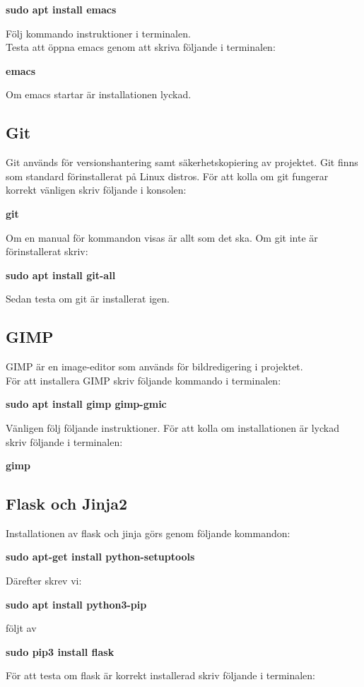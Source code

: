 \documentclass{TDP003mall}
\begin{document}
\textbf{sudo apt install emacs}

Följ kommando instruktioner i terminalen. \\
Testa att öppna emacs genom att skriva följande i terminalen:

\textbf{emacs}

Om emacs startar är installationen lyckad.

\subsection{Git}
Git används för versionshantering samt säkerhetskopiering av projektet. Git finns som standard förinstallerat på Linux distros. För att kolla om git fungerar korrekt vänligen skriv följande i konsolen:

\textbf{git}

Om en manual för kommandon visas är allt som det ska. Om git inte är förinstallerat skriv:

\textbf{sudo apt install git-all}

Sedan testa om git är installerat igen.

\subsection{GIMP}
GIMP är en image-editor som används för bildredigering i projektet.\\
För att installera GIMP skriv följande kommando i terminalen:

\textbf{sudo apt install gimp gimp-gmic}

Vänligen följ följande instruktioner. För att kolla om installationen är lyckad skriv följande i terminalen:

\textbf{gimp}

\subsection{Flask och Jinja2}
Installationen av flask och jinja görs genom följande kommandon:

\textbf{sudo apt-get install python-setuptools}

Därefter skrev vi:

\textbf{sudo apt install python3-pip}

följt av

\textbf{sudo pip3 install flask}

För att testa om flask är korrekt installerad skriv följande i terminalen:
\end{document}
